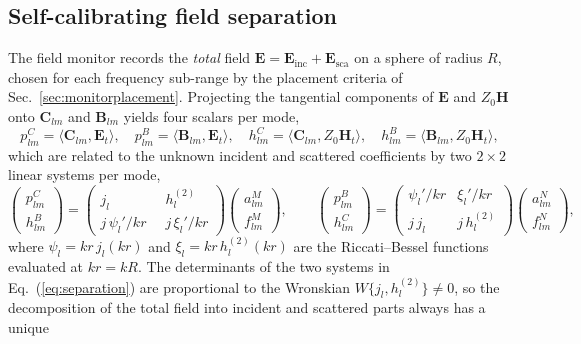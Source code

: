 \documentclass[11pt]{article}
\newcommand{\EE}{\mathbf{E}}
\newcommand{\HH}{\mathbf{H}}
\begin{document}
\subsection{Self-calibrating field separation}
\label{sec:separation}
The field monitor records the \emph{total} field
$\EE = \EE_{\mathrm{inc}} + \EE_{\mathrm{sca}}$ on a sphere of radius
$R$, chosen for each frequency sub-range by the placement criteria of
Sec.~\ref{sec:monitorplacement}.  Projecting the tangential components of
$\EE$ and $Z_0\HH$ onto $\mathbf{C}_{lm}$ and $\mathbf{B}_{lm}$ yields
four scalars per mode,
\begin{equation}
p^C_{lm} = \langle \mathbf{C}_{lm}, \EE_t\rangle,\quad
p^B_{lm} = \langle \mathbf{B}_{lm}, \EE_t\rangle,\quad
h^C_{lm} = \langle \mathbf{C}_{lm}, Z_0\HH_t\rangle,\quad
h^B_{lm} = \langle \mathbf{B}_{lm}, Z_0\HH_t\rangle,
\end{equation}
which are related to the unknown incident and scattered coefficients by
two $2\times 2$ linear systems per mode,
\begin{equation}
\begin{pmatrix} p^C_{lm}\\ h^B_{lm} \end{pmatrix}
=
\begin{pmatrix} j_l & h^{(2)}_l\\[2pt]
 j\,\psi_l' /kr\;\; & j\,\xi_l'/kr \end{pmatrix}
\begin{pmatrix} a^M_{lm}\\ f^M_{lm} \end{pmatrix},
\qquad
\begin{pmatrix} p^B_{lm}\\ h^C_{lm} \end{pmatrix}
=
\begin{pmatrix} \psi_l'/kr & \xi_l'/kr\\[2pt]
 j\,j_l & j\,h^{(2)}_l \end{pmatrix}
\begin{pmatrix} a^N_{lm}\\ f^N_{lm} \end{pmatrix},
\label{eq:separation}
\end{equation}
where $\psi_l = kr\,j_l(kr)$ and $\xi_l = kr\,h^{(2)}_l(kr)$ are the
Riccati--Bessel functions evaluated at $kr = kR$.  The determinants of
the two systems in Eq.~(\ref{eq:separation}) are proportional to the
Wronskian $W\{j_l, h^{(2)}_l\} \neq 0$, so the decomposition of the
total field into incident and scattered parts always has a unique
\end{document}
